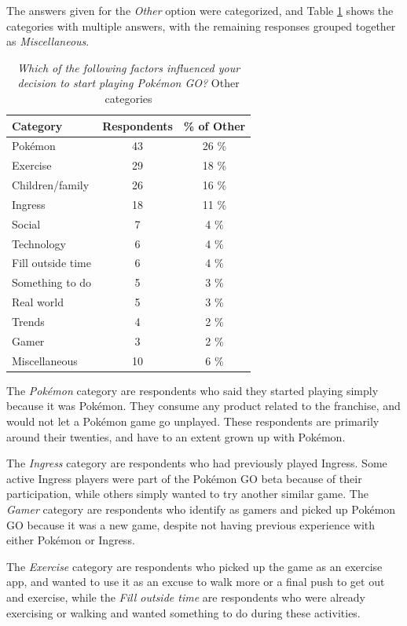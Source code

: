 The answers given for the \emph{Other} option were categorized, and Table \ref{tbl:initial-interest-other-categories} shows the categories with multiple answers, with the remaining responses grouped together as \emph{Miscellaneous}.

\begin{table}[h]
	\caption{\emph{Which of the following factors influenced your decision to start playing Pokémon GO?} Other categories}
	\centering
	\label{tbl:initial-interest-other-categories}
	\begin{tabular}{|l|c|c|}
		\hline
		\textbf{Category} & \textbf{Respondents} & \textbf{\% of Other}\\
		\hline\hline
		Pokémon & 43 & 26 \%\\\hline
		Exercise & 29 & 18 \%\\\hline
		Children/family & 26 & 16 \%\\\hline
		Ingress & 18 & 11 \%\\\hline
		Social & 7 & 4 \%\\\hline
		Technology & 6 & 4 \%\\\hline
		Fill outside time & 6 & 4 \%\\\hline
		Something to do & 5 & 3 \%\\\hline
		Real world & 5 & 3 \%\\\hline
		Trends & 4 & 2 \%\\\hline
		Gamer & 3 & 2 \%\\\hline
		Miscellaneous & 10 & 6 \%\\\hline
	\end{tabular}
\end{table}

The \emph{Pokémon} category are respondents who said they started playing simply because it was Pokémon. They consume any product related to the franchise, and would not let a Pokémon game go unplayed. These respondents are primarily around their twenties, and have to an extent grown up with Pokémon.

The \emph{Ingress} category are respondents who had previously played Ingress. Some active Ingress players were part of the Pokémon GO beta because of their participation, while others simply wanted to try another similar game. The \emph{Gamer} category are respondents who identify as gamers and picked up Pokémon GO because it was a new game, despite not having previous experience with either Pokémon or Ingress.

The \emph{Exercise} category are respondents who picked up the game as an exercise app, and wanted to use it as an excuse to walk more or a final push to get out and exercise, while the \emph{Fill outside time} are respondents who were already exercising or walking and wanted something to do during these activities.

